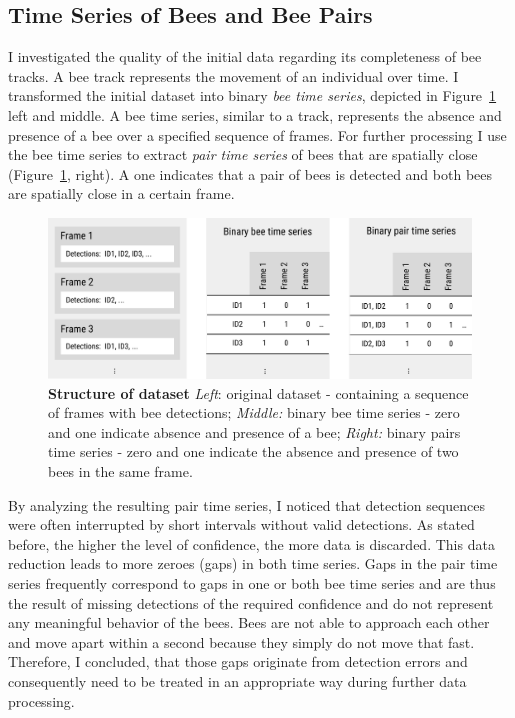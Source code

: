 \subsection{Time Series of Bees and Bee Pairs}
\label{subsec:tracking}
I investigated the quality of the initial data regarding its completeness of bee tracks.
A bee track represents the movement of an individual over time.
I transformed the initial dataset into binary \emph{bee time series}, depicted in Figure~\ref{fig:structure} left and middle.
A bee time series, similar to a track, represents the absence and presence of a bee over a specified sequence of frames.
For further processing I use the bee time series to extract \emph{pair time series} of bees that are spatially close (Figure~\ref{fig:structure}, right).
A one indicates that a pair of bees is detected and both bees are spatially close in a certain frame.

\begin{figure}[htbp]
	\centering
	\includegraphics[width=1.0\textwidth]{Figures/structure}
	\caption[Structure of dataset]{\textbf{Structure of dataset} \emph{Left}: original dataset - containing a sequence of frames with bee detections; \emph{Middle:} binary bee time series - zero and one indicate absence and presence of a bee; \emph{Right:} binary pairs time series - zero and one indicate the absence and presence of two bees in the same frame.}
	\label{fig:structure}
\end{figure}

By analyzing the resulting pair time series, I noticed that detection sequences were often interrupted by short intervals without valid detections.
As stated before, the higher the level of confidence, the more data is discarded.
This data reduction leads to more zeroes (gaps) in both time series.
Gaps in the pair time series frequently correspond to gaps in one or both bee time series and are thus the result of missing detections of the required confidence and do not represent any meaningful behavior of the bees.
Bees are not able to approach each other and move apart within a second because they simply do not move that fast.
Therefore, I concluded, that those gaps originate from detection errors and consequently need to be treated in an appropriate way during further data processing.